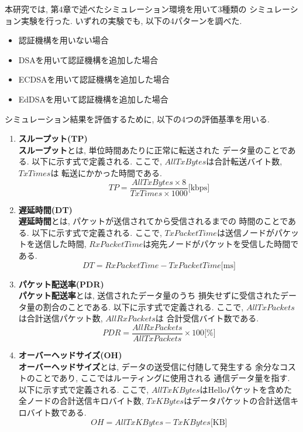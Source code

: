 本研究では, 第4章で述べたシミュレーション環境を用いて3種類の
シミュレーション実験を行った. いずれの実験でも, 以下の4パターンを調べた. 
\begin{itemize}
  \item 認証機構を用いない場合
  \item DSAを用いて認証機構を追加した場合
  \item ECDSAを用いて認証機構を追加した場合
  \item EdDSAを用いて認証機構を追加した場合
\end{itemize}
\indent シミュレーション結果を評価するために, 
以下の4つの評価基準を用いる. 
\begin{enumerate}
  \item \textbf{スループット(TP)}\\
  \indent \textbf{スループット}とは, 単位時間あたりに正常に転送された
  データ量のことである. 以下に示す式で定義される. ここで, 
  $AllTxBytes$は合計転送バイト数, $TxTimes$は
  転送にかかった時間である. \\
  \[
    TP = \frac{AllTxBytes\times 8}{TxTimes\times 1000}\text{[kbps]}
  \]
  \item \textbf{遅延時間(DT)}\\
  \indent \textbf{遅延時間}とは, パケットが送信されてから受信されるまでの
  時間のことである. 以下に示す式で定義される. ここで,
  $TxPacketTime$は送信ノードがパケットを送信した時間, 
  $RxPacketTime$は宛先ノードがパケットを受信した時間である. \\
  \[
    DT = RxPacketTime - TxPacketTime \text{[ms]}
  \]

  \item \textbf{パケット配送率(PDR)}\\
  \indent \textbf{パケット配送率}とは, 送信されたデータ量のうち
  損失せずに受信されたデータ量の割合のことである. 以下に示す式で定義される. 
  ここで, $AllTxPackets$は合計送信パケット数, $AllRxPackets$は
  合計受信バイト数である. \\
  \[
    PDR = \frac{AllRxPackets}{AllTxPackets} \times 100 \text{[\%]}
  \]

  \item \textbf{オーバーヘッドサイズ(OH)}\\
  \indent \textbf{オーバーヘッドサイズ}とは, データの送受信に付随して発生する
  余分なコストのことであり, ここではルーティングに使用される
  通信データ量を指す. 以下に示す式で定義される. ここで, 
  $AllTxKBytes$はHelloパケットを含めた全ノードの合計送信キロバイト数, 
  $TxKBytes$はデータパケットの合計送信キロバイト数である. \\
  \[
    OH = AllTxKBytes - TxKBytes \text{[KB]}
  \]
\end{enumerate}
\vspace{2em}


